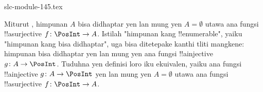 \begin{filecontents*}[overwrite]{slc-module-145.tex}
\begin{prob}
  Miturut , himpunan $A$
  bisa didhaptar yen lan mung yen $A = \emptyset$ utawa ana fungsi !!a{surjective} $f\colon
  \PosInt \to A$. Istilah "himpunan kang !!{enumerable}", yaiku
  "himpunan kang bisa didhaptar", uga bisa ditetepake kanthi tliti mangkene:
  himpunan bisa didhaptar yen lan mung yen ana fungsi !!a{injective}
  $g\colon A \to \PosInt$. Tuduhna yen definisi loro iku
  ekuivalen, yaiku ana fungsi !!a{injective}
  $g\colon A \to \PosInt$ yen lan mung yen $A = \emptyset$ utawa ana
  fungsi !!a{surjective} $f\colon \PosInt \to A$.
\end{prob}


\end{filecontents*}


